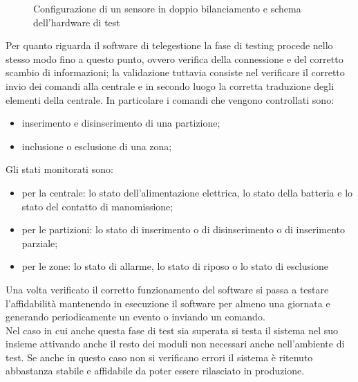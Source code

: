\begin{figure}
	\centering
	\caption{Configurazione di un sensore in doppio bilanciamento e schema dell'hardware di test}
\end{figure}
Per quanto riguarda il software di telegestione la fase di testing procede nello stesso modo fino a questo punto, ovvero verifica della connessione e del corretto scambio di informazioni; la validazione tuttavia consiste nel verificare il corretto invio dei comandi alla centrale e in secondo luogo la corretta traduzione degli elementi della centrale. In particolare i comandi che vengono controllati sono:
\begin{itemize}
	\item inserimento e disinserimento di una partizione;
	\item inclusione o esclusione di una zona;
\end{itemize}
Gli stati monitorati sono:
\begin{itemize}
	\item per la centrale: lo stato dell'alimentazione elettrica, lo stato della batteria e lo stato del contatto di manomissione;
	\item per le partizioni: lo stato di inserimento o di disinserimento o di inserimento parziale;
	\item per le zone: lo stato di allarme, lo stato di riposo o lo stato di esclusione
\end{itemize}
Una volta verificato il corretto funzionamento del software si passa a testare l'affidabilità mantenendo in esecuzione il software per almeno una giornata e generando periodicamente un evento o inviando un comando.\\
Nel caso in cui anche questa fase di test sia superata si testa il sistema nel suo insieme attivando anche il resto dei moduli non necessari anche nell'ambiente di test. Se anche in questo caso non si verificano errori il sistema è ritenuto abbastanza stabile e affidabile da poter essere rilasciato in produzione.
